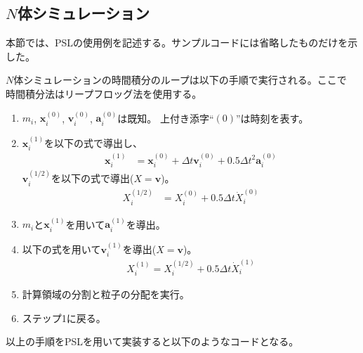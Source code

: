 \subsection{$N$体シミュレーション}
\label{sec:Nbody}

本節では、PSLの使用例を記述する。サンプルコードには省略したものだけを示
した。

$N$体シミュレーションの時間積分のループは以下の手順で実行される。ここで
時間積分法はリープフロッグ法を使用する。
\begin{enumerate}
\item $m_i$, $\bm{x}_i^{(0)}$, $\bm{v}_i^{(0)}$, $\bm{a}_i^{(0)}$は既知。
  上付き添字``$(0)$''は時刻を表す。
\item $\bm{x}_i^{(1)}$を以下の式で導出し、
  \begin{align}
    \bm{x}_i^{(1)} &= \bm{x}_i^{(0)} + \Delta t \bm{v}_i^{(0)} + 0.5
    \Delta t^2 \bm{a}_i^{(0)} \label{eq:ipos}
  \end{align}
  $\bm{v}_i^{(1/2)}$を以下の式で導出($X=\bm{v}$)。
  \begin{align}
    X_i^{(1/2)} &= X_i^{(0)} + 0.5 \Delta t
    \dot{X}_i^{(0)} \label{eq:half}
  \end{align}
\item $m_i$と$\bm{x}_i^{(1)}$を用いて$\bm{a}_i^{(1)}$を導出。
\item 以下の式を用いて$\bm{v}_i^{(1)}$を導出($X=\bm{v}$)。
  \begin{align}
    X_i^{(1)} = X_i^{(1/2)} + 0.5 \Delta t \dot{X}_i^{(1)} \label{eq:corr}
  \end{align}
\item 計算領域の分割と粒子の分配を実行。
\item ステップ1に戻る。
\end{enumerate}

以上の手順をPSLを用いて実装すると以下のようなコードとなる。

